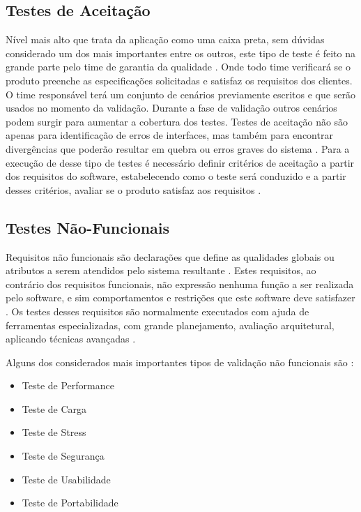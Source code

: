 \subsection{Testes de Aceitação}

Nível mais alto que trata da aplicação como uma caixa preta, sem dúvidas considerado um dos mais importantes entre os outros, este tipo de teste é feito na grande parte  pelo time de garantia da qualidade \cite{James2012}. Onde todo time verificará se o produto preenche as especificações solicitadas e satisfaz os requisitos dos clientes. O time responsável terá um conjunto de cenários previamente escritos e que serão usados no momento da validação. Durante a fase de validação outros cenários podem  surgir para aumentar a cobertura dos testes. Testes de aceitação não são apenas para identificação de erros de interfaces, mas também para encontrar divergências que poderão resultar em quebra ou erros graves do sistema \cite{tutorialsPoint}. Para a execução de desse tipo de testes é necessário definir critérios de aceitação a partir dos requisitos do software, estabelecendo como o teste será conduzido e a partir desses critérios, avaliar se o produto satisfaz aos requisitos \cite{SoftexRecife}.

\subsection{Testes Não-Funcionais}

Requisitos não funcionais são declarações que define as qualidades globais ou atributos a serem atendidos pelo sistema resultante \cite{Kirner1996}. Estes requisitos, ao contrário dos requisitos funcionais, não expressão nenhuma função a ser realizada pelo software, e sim comportamentos e restrições que este software deve satisfazer \cite{Cysneiros1997}. Os testes desses requisitos são normalmente executados com ajuda de ferramentas especializadas, com grande planejamento, avaliação arquitetural, aplicando técnicas avançadas \cite{tutorialsPoint}.

Alguns dos considerados mais importantes tipos de validação não funcionais são \cite{tutorialsPoint}:
\begin{itemize}
	\item Teste de Performance
	\item Teste de Carga
	\item Teste de Stress
	\item Teste de Segurança
	\item Teste de Usabilidade
	\item Teste de Portabilidade
\end{itemize}

